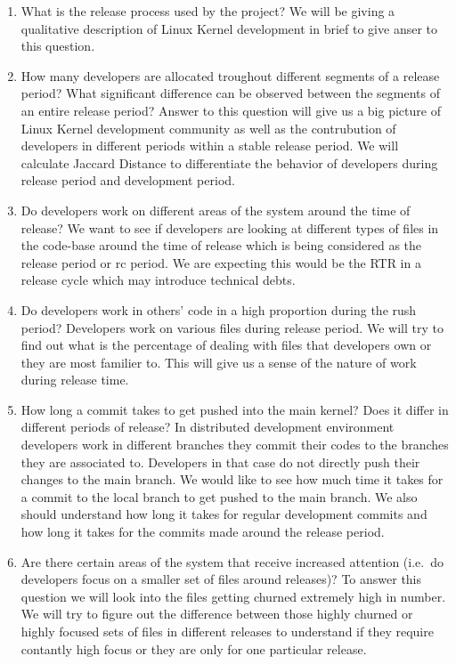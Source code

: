 \documentclass{acm_proc_article-sp}
\begin{document}
\renewcommand{\labelenumi}{Q\theenumi:}
\begin{enumerate}
\item What is the release process used by the project? \newline
We will be giving a qualitative description of Linux Kernel development in brief to give anser to this question.
\item How many developers are allocated troughout different segments of a release period? What significant difference can be observed between the segments of an entire release period? \newline
Answer to this question will give us a big picture of Linux Kernel development community as well as the contrubution of developers in different periods within a stable release period. We will calculate Jaccard Distance to differentiate the behavior of developers during release period and development period.
\item Do developers work on different areas of the system around the time of release? \newline
We want to see if developers are looking at different types of files in the code-base around the time of release which is being considered as the release period or rc period. We are expecting this would be the RTR in a release cycle which may introduce technical debts.
\item Do developers work in others' code in a high proportion during the rush period?\newline
Developers work on various files during release period. We will try to find out what is the percentage of dealing with files that developers own or they are most familier to. This will give us a sense of the nature of work during release time.
\item How long a commit takes to get pushed into the main kernel? Does it differ in different periods of release?\newline
In distributed development environment developers work in different branches they commit their codes to the branches they are associated to. Developers in that case do not directly push their changes to the main branch. We would like to see how much time it takes for a commit to the local branch to get pushed to the main branch. We also should understand how long it takes for regular development commits and how long it takes for the commits made around the release period.
\item Are there certain areas of the system that receive increased attention (i.e.\ do developers focus on a smaller set of files around releases)? \newline
To answer this question we will look into the files getting churned extremely high in number. We will try to figure out the difference between those highly churned or highly focused sets of files in different releases to understand if they require contantly high focus or they are only for one particular release.
\end{enumerate}
\end{document}
